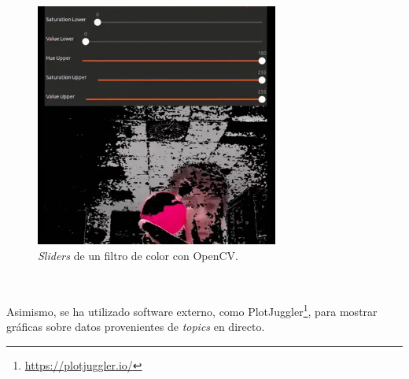 \begin{figure} [h!]
  \begin{center}
    \includegraphics[width=8cm]{figs/opencv_visualization}
  \end{center}
  \caption{\textit{Sliders} de un filtro de color con OpenCV.}
  \label{fig:opencv}
\end{figure}\

Asimismo, se ha utilizado software externo, como
PlotJuggler\footnote{\href{https://plotjuggler.io/}{https://plotjuggler.io/}},
para mostrar gráficas sobre datos provenientes de \textit{topics} en directo.


